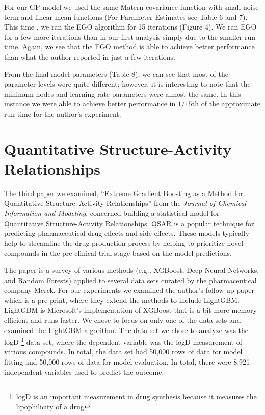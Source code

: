 \documentclass[12pt]{article}
\begin{document}
For our GP model we used the same Matern covariance function with small noise term and linear mean functions (For Parameter Estimates see Table 6 and 7). This time , we ran the EGO algorithm for 15 iterations (Figure 4). We ran EGO for a few more iterations than in our first analysis simply due to the smaller run time. Again, we see that the EGO method is able to achieve better performance than what the author reported in just a few iterations. 

From the final model parameters (Table 8), we can see that most of the parameter levels were quite different; however, it is interesting to note that the minimum nodes and learning rate parameters were almost the same. In this instance we were able to achieve better performance in $1/15$th of the approximate run time for the author's experiment.

\section{Quantitative Structure-Activity Relationships}
The third paper we examined, “Extreme Gradient Boosting as a Method for Quantitative Structure–Activity Relationships” from the \textit{Journal of Chemical Information and Modeling}, concerned building a statistical model for Quantitative Structure-Activity Relationships. QSAR is a popular technique for predicting pharmaceutical drug effects and side effects. These models typically help to streamline the drug production process by helping to prioritize novel compounds in the pre-clinical trial stage based on the model predictions.

          	The paper is a survey of various methods (e.g., XGBoost, Deep Neural Networks, and Random Forests) applied to several data sets curated by the pharmaceutical company Merck. For our experiments we examined the author’s follow up paper which is a pre-print, where they extend the methods to include LightGBM. LightGBM is Microsoft's implementation of XGBoost that is a bit more memory efficient and runs faster. We chose to focus on only one of the data sets and examined the LightGBM algorithm. The data set we chose to analyze was the logD \footnote{logD is an important measurement in drug synthesis because it measures the lipophilicity of a drug} data set, where the dependent variable was the logD measurement of various compounds. In total, the data set had 50,000 rows of data for model fitting and 50,000 rows of data for model evaluation. In total, there were 8,921 independent variables used to predict the outcome.         
          	
\end{document}
